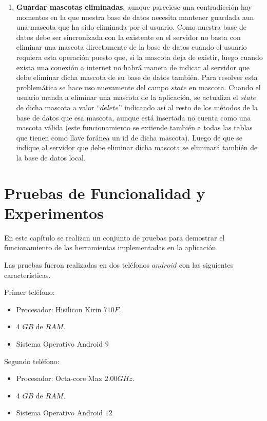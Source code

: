 \begin{enumerate}
\item\textbf{Guardar mascotas eliminadas}: aunque pareciese una contradicción hay momentos en la que nuestra base de datos necesita mantener guardada aun una mascota que ha sido eliminada por el usuario. Como nuestra base de datos debe ser sincronizada con la existente en el servidor no basta con eliminar una mascota directamente de la base de datos cuando el usuario requiera esta operación puesto que, si la mascota deja de existir, luego cuando exista una conexión a internet no habrá manera de indicar al servidor que debe eliminar dicha mascota de su base de datos también. Para resolver esta problemática se hace uso nuevamente del campo $state$ en mascota. Cuando el usuario manda a eliminar una mascota de la aplicación, se actualiza el $state$ de dicha mascota a valor “$delete$” indicando así al resto de los métodos de la base de datos que esa mascota, aunque está insertada no cuenta como una mascota válida (este funcionamiento se extiende también a todas las tablas que tienen como llave foránea un id de dicha mascota). Luego de que se indique al servidor que debe eliminar dicha mascota se eliminará también de la base de datos local.
\end{enumerate}

\chapter{Pruebas de Funcionalidad y Experimentos}

En este capítulo se realizan un conjunto de pruebas para demostrar el funcionamiento de las herramientas implementadas en la aplicación.

Las pruebas fueron realizadas en dos teléfonos $android$ con las siguientes características.

Primer teléfono:

\begin{itemize}
\item Procesador: Hisilicon Kirin $710F$.
\item 4 $GB$ de $RAM$.
\item Sistema Operativo Android $9$
\end{itemize} 

Segundo teléfono:

\begin{itemize}
\item Procesador: Octa-core Max $2.00GHz$.
\item 4 $GB$ de $RAM$.
\item Sistema Operativo Android $12$
\end{itemize} 

